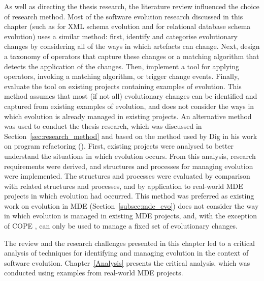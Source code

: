 As well as directing the thesis research, the literature review influenced the choice of research method. Most of the software evolution research discussed in this chapter (such as \cite{guerrini05impact,kramer01xem,su01xem} for XML schema evolution and \cite{banerjee87semantics,edelweiss05temporal} for relational database schema evolution) uses a similar method: first, identify and categorise evolutionary changes by considering all of the ways in which artefacts can change. Next, design a taxonomy of operators that capture these changes or a matching algorithm that detects the application of the changes. Then, implement a tool for applying operators, invoking a matching algorithm, or trigger change events. Finally, evaluate the tool on existing projects containing examples of evolution. This method assumes that most (if not all) evolutionary changes can be identified and captured from existing examples of evolution, and does not consider the ways in which evolution is already managed in existing projects. An alternative method was used to conduct the thesis research, which was discussed in Section~\ref{sec:research_method} and based on the method used by Dig in his work on program refactoring (\cite{dig07thesis}). First, existing projects were analysed to better understand the situations in which evolution occurs. From this analysis, research requirements were derived, and structures and processes for managing evolution were implemented. The structures and processes were evaluated by comparison with related structures and processes, and by application to real-world MDE projects in which evolution had occurred. This method was preferred as existing work on evolution in MDE (Section~\ref{subsec:mde_evo}) does not consider the way in which evolution is managed in existing MDE projects, and, with the exception of COPE \cite{herrmannsdoerfer09cope}, can only be used to manage a fixed set of evolutionary changes.

The review and the research challenges presented in this chapter led to a critical analysis of techniques for identifying and managing evolution in the context of software evolution. Chapter~\ref{Analysis} presents the critical analysis, which was conducted using examples from real-world MDE projects.